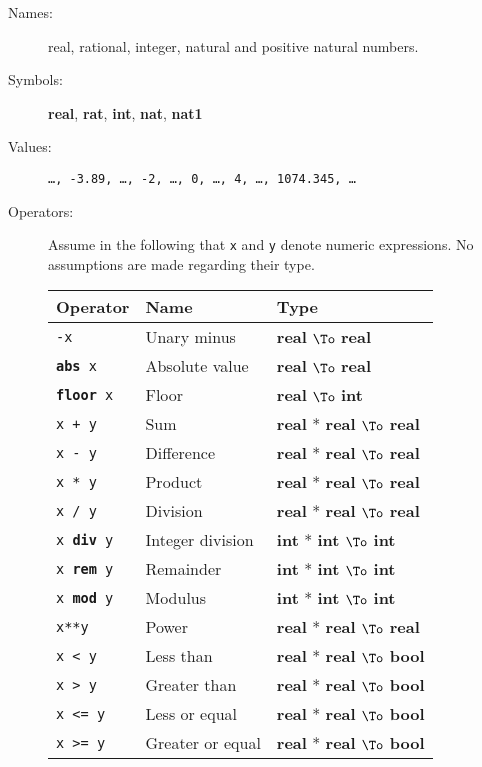\documentclass{overturerepchap}
\newcommand{\keyw}[1]{{\bf\ttfamily #1}}
\newcommand{\PROD}[2]{#1 * #2}
\newcommand{\TO}[2]{#1 $\To$ #2}
\begin{document}
\begin{description}
\item[Names:] real, rational, integer, natural and positive natural
  numbers.
\item[Symbols:] \keyw{real}, \keyw{rat}, \keyw{int}, \keyw{nat},
  \keyw{nat1}
\item[Values:] {\tt \ldots, -3.89, \ldots, -2, \ldots, 0, \ldots, 4,
    \ldots, 1074.345, \ldots}
\item[Operators:] Assume in the following that {\tt x} and {\tt y} denote
  numeric expressions. No assumptions are made regarding their type.

  \begin{tabular}{|l|l|l|}\hline
    Operator       & Name & Type \\ \hline
    {\tt -x}& Unary minus & \TO{\keyw{real}}{\keyw{real}} \\
    {\tt \keyw{abs} x}& Absolute value & \TO{\keyw{real}}{\keyw{real}} \\
    {\tt \keyw{floor} x}& Floor  & \TO{\keyw{real}}{\keyw{int}} \\
    {\tt x + y}& Sum    & \TO{\PROD{\keyw{real}}{\keyw{real}}}{\keyw{real}} \\
    {\tt x - y}& Difference & \TO{\PROD{\keyw{real}}{\keyw{real}}}{\keyw{real}} \\
    {\tt x * y}& Product  & \TO{\PROD{\keyw{real}}{\keyw{real}}}{\keyw{real}} \\
    {\tt x / y}& Division & \TO{\PROD{\keyw{real}}{\keyw{real}}}{\keyw{real}} \\
    {\tt x \keyw{div} y}& Integer division & \TO{\PROD{\keyw{int}}{\keyw{int}}}{\keyw{int}} \\
    {\tt x \keyw{rem} y}& Remainder & \TO{\PROD{\keyw{int}}{\keyw{int}}}{\keyw{int}} \\
    {\tt x \keyw{mod} y}& Modulus   & \TO{\PROD{\keyw{int}}{\keyw{int}}}{\keyw{int}} \\
    {\tt x**y}& Power & \TO{\PROD{\keyw{real}}{\keyw{real}}}{\keyw{real}} \\
    {\tt x < y}& Less than & \TO{\PROD{\keyw{real}}{\keyw{real}}}{\keyw{bool}} \\
    {\tt x > y}& Greater than & \TO{\PROD{\keyw{real}}{\keyw{real}}}{\keyw{bool}} \\
    {\tt x <= y}& Less or equal & \TO{\PROD{\keyw{real}}{\keyw{real}}}{\keyw{bool}} \\
    {\tt x >= y}& Greater or equal & \TO{\PROD{\keyw{real}}{\keyw{real}}}{\keyw{bool}} \\

\end{tabular}
\end{description}
\end{document}
